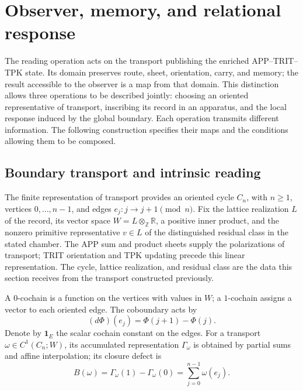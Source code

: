 
\section{Observer, memory, and relational response}
\label{vii:sec:observador-respuesta}

The reading operation acts on the transport publishing the enriched
APP--TRIT--TPK state. Its domain preserves route, sheet, orientation,
carry, and memory; the result accessible to the observer is a map
from that domain. This distinction allows three operations to be
described jointly: choosing an oriented representative of transport,
inscribing its record in an apparatus, and the local response induced
by the global boundary. Each operation transmits different information.
The following construction specifies their maps and the conditions
allowing them to be composed.

\subsection{Boundary transport and intrinsic reading}
\label{vii:sec:observador-ciclo}

The finite representation of transport provides an oriented cycle
\(C_n\), with \(n\geq1\), vertices \(0,\ldots,n-1\), and edges
\(e_j:j\longrightarrow j+1\pmod n\). Fix the lattice realization
\(L\) of the record, its vector space
\(W=L\otimes_{\mathbb Z}\mathbb R\), a positive inner product, and
the nonzero primitive representative \(v\in L\) of the distinguished
residual class in the stated chamber. The APP sum and product sheets
supply the polarizations of transport; TRIT orientation and TPK
updating precede this linear representation. The cycle,
lattice realization, and residual class are the data this section
receives from the transport constructed previously.

A \(0\)-cochain is a function on the vertices with values in
\(W\); a \(1\)-cochain assigns a vector to each oriented edge.
The coboundary acts by
\[
 (d\Phi)(e_j)=\Phi(j+1)-\Phi(j).
\]
Denote by \(\mathbf1_E\) the scalar cochain constant on the
edges. For a transport \(\omega\in C^1(C_n;W)\), its accumulated
representation \(\Gamma_\omega\) is obtained by partial sums and
affine interpolation; its closure defect is
\begin{equation}
 B(\omega)=\Gamma_\omega(1)-\Gamma_\omega(0)
 =\sum_{j=0}^{n-1}\omega(e_j).
 \label{vii:eq:observador-defecto}
\end{equation}

